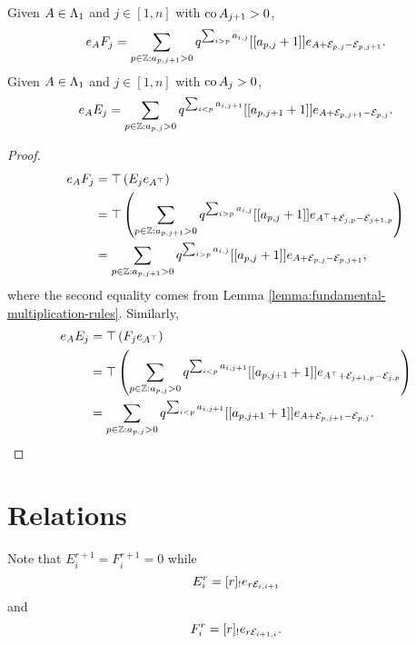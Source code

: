 \documentclass[a4paper, 11pt]{report}
\begin{document}
\begin{corollary}\label{corollary:fundamental-right-multiplication-rules}
Given $A\in{\Lambda_1}$ and $j\in[1,n]$ with $\operatorname{co}{A}_{j+1}>0$,
\begin{equation*}
e_AF_j = \sum_{p\in\mathbb{Z}: a_{p,j+1}>0} q^{\sum_{i>p}a_{i,j}} [[a_{p,j}+1]] e_{A+\mathcal{E}_{p,j}-\mathcal{E}_{p,j+1}}.
\end{equation*}
Given $A\in{\Lambda_1}$ and $j\in[1,n]$ with $\operatorname{co}{A}_{j}>0$,
\begin{equation*}
e_AE_j = \sum_{p\in\mathbb{Z}: a_{p,j}>0} q^{\sum_{i<p} a_{i,j+1}} [[a_{p,j+1}+1]] e_{A+\mathcal{E}_{p,j+1}-\mathcal{E}_{p,j}}.
\end{equation*}
\end{corollary}

\begin{proof}
\begin{align*}
e_AF_j
&= \top\left(E_j e_{A^\top}\right)\\
&= \top\left(\sum_{p\in\mathbb{Z}: a_{p,j+1}>0} q^{\sum_{i>p} a_{i,j}} [[a_{p,j}+1]] e_{A^\top +\mathcal{E}_{j,p} -\mathcal{E}_{j+1,p}}\right)\\
&= \sum_{p\in\mathbb{Z}: a_{p,j+1}>0} q^{\sum_{i>p}a_{i,j}} [[a_{p,j}+1]] e_{A+\mathcal{E}_{p,j}-\mathcal{E}_{p,j+1}},
\end{align*}
where the second equality comes from Lemma \ref{lemma:fundamental-multiplication-rules}. Similarly,
\begin{align*}
e_AE_j
&= \top\left(F_j e_{A^\top}\right)\\
&= \top\left( \sum_{p\in\mathbb{Z}:a_{p,j}>0} q^{\sum_{i<p} a_{i,j+1}} [[a_{p,j+1}+1]] e_{A^\top +\mathcal{E}_{j+1,p} - \mathcal{E}_{j,p}}\right)\\
&= \sum_{p\in\mathbb{Z}: a_{p,j}>0} q^{\sum_{i<p}a_{i,j+1}} [[a_{p,j+1}+1]] e_{A+\mathcal{E}_{p,j+1} -\mathcal{E}_{p,j}}.
\end{align*}
\end{proof}

\section{Relations}

Note that $E_i^{r+1}=F_i^{r+1}=0$ while
\begin{equation*}
E_i^r = [r]_! e_{r\mathcal{E}_{i,i+1}}
\end{equation*}
and
\begin{equation*}
F_i^r = [r]_! e_{r\mathcal{E}_{i+1,i}}.
\end{equation*}
\end{document}
